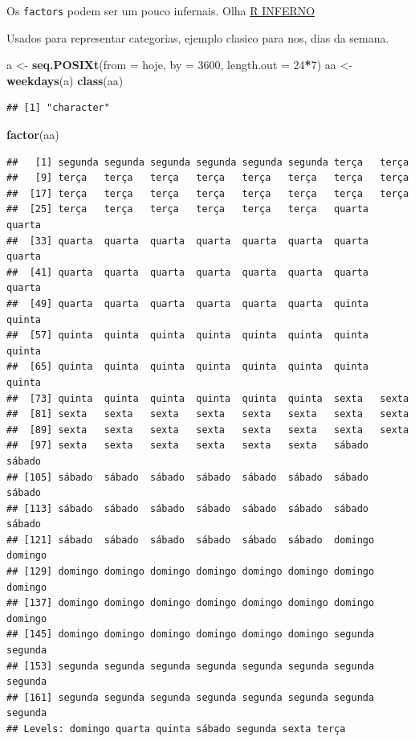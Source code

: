 \documentclass[]{book}
\newenvironment{Shaded}{\begin{snugshade}}{\end{snugshade}}
\newcommand{\KeywordTok}[1]{\textcolor[rgb]{0.13,0.29,0.53}{\textbf{#1}}}
\newcommand{\DataTypeTok}[1]{\textcolor[rgb]{0.13,0.29,0.53}{#1}}
\newcommand{\DecValTok}[1]{\textcolor[rgb]{0.00,0.00,0.81}{#1}}
\newcommand{\StringTok}[1]{\textcolor[rgb]{0.31,0.60,0.02}{#1}}
\newcommand{\OperatorTok}[1]{\textcolor[rgb]{0.81,0.36,0.00}{\textbf{#1}}}
\newcommand{\NormalTok}[1]{#1}
\theoremstyle{definition}
\theoremstyle{definition}
\theoremstyle{definition}
\theoremstyle{remark}
\begin{document}
Os \texttt{factors} podem ser um pouco infernais. Olha
\href{http://www.burns-stat.com/documents/books/the-r-inferno/}{R
INFERNO}

Usados para representar categorias, ejemplo clasico para nos, dias da
semana.

\begin{Shaded}
\begin{Highlighting}[]
\NormalTok{a <-}\StringTok{ }\KeywordTok{seq.POSIXt}\NormalTok{(}\DataTypeTok{from =}\NormalTok{ hoje, }\DataTypeTok{by =} \DecValTok{3600}\NormalTok{, }\DataTypeTok{length.out =} \DecValTok{24}\OperatorTok{*}\DecValTok{7}\NormalTok{)}
\NormalTok{aa <-}\StringTok{ }\KeywordTok{weekdays}\NormalTok{(a)}
\KeywordTok{class}\NormalTok{(aa)}
\end{Highlighting}
\end{Shaded}

\begin{verbatim}
## [1] "character"
\end{verbatim}

\begin{Shaded}
\begin{Highlighting}[]
\KeywordTok{factor}\NormalTok{(aa)}
\end{Highlighting}
\end{Shaded}

\begin{verbatim}
##   [1] segunda segunda segunda segunda segunda segunda terça   terça  
##   [9] terça   terça   terça   terça   terça   terça   terça   terça  
##  [17] terça   terça   terça   terça   terça   terça   terça   terça  
##  [25] terça   terça   terça   terça   terça   terça   quarta  quarta 
##  [33] quarta  quarta  quarta  quarta  quarta  quarta  quarta  quarta 
##  [41] quarta  quarta  quarta  quarta  quarta  quarta  quarta  quarta 
##  [49] quarta  quarta  quarta  quarta  quarta  quarta  quinta  quinta 
##  [57] quinta  quinta  quinta  quinta  quinta  quinta  quinta  quinta 
##  [65] quinta  quinta  quinta  quinta  quinta  quinta  quinta  quinta 
##  [73] quinta  quinta  quinta  quinta  quinta  quinta  sexta   sexta  
##  [81] sexta   sexta   sexta   sexta   sexta   sexta   sexta   sexta  
##  [89] sexta   sexta   sexta   sexta   sexta   sexta   sexta   sexta  
##  [97] sexta   sexta   sexta   sexta   sexta   sexta   sábado  sábado 
## [105] sábado  sábado  sábado  sábado  sábado  sábado  sábado  sábado 
## [113] sábado  sábado  sábado  sábado  sábado  sábado  sábado  sábado 
## [121] sábado  sábado  sábado  sábado  sábado  sábado  domingo domingo
## [129] domingo domingo domingo domingo domingo domingo domingo domingo
## [137] domingo domingo domingo domingo domingo domingo domingo domingo
## [145] domingo domingo domingo domingo domingo domingo segunda segunda
## [153] segunda segunda segunda segunda segunda segunda segunda segunda
## [161] segunda segunda segunda segunda segunda segunda segunda segunda
## Levels: domingo quarta quinta sábado segunda sexta terça
\end{verbatim}
\end{document}
